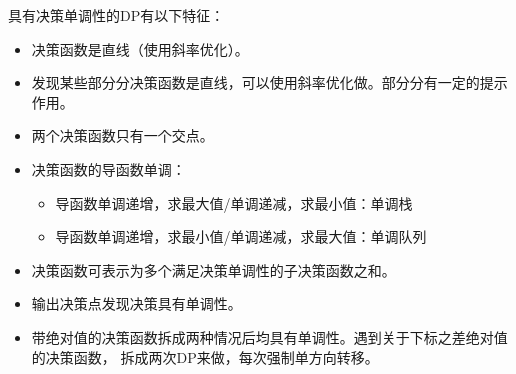 具有决策单调性的DP有以下特征：

\begin{itemize}
    \item 决策函数是直线（使用斜率优化）。
    \item 发现某些部分分决策函数是直线，可以使用斜率优化做。部分分有一定的提示作用。
    \item 两个决策函数只有一个交点。
    \item 决策函数的导函数单调：
    \begin{itemize}
        \item 导函数单调递增，求最大值/单调递减，求最小值：单调栈
        \item 导函数单调递增，求最小值/单调递减，求最大值：单调队列
    \end{itemize}
    \item 决策函数可表示为多个满足决策单调性的子决策函数之和。
    \item 输出决策点发现决策具有单调性。
    \item 带绝对值的决策函数拆成两种情况后均具有单调性。遇到关于下标之差绝对值的决策函数，
    拆成两次DP来做，每次强制单方向转移。
\end{itemize}
